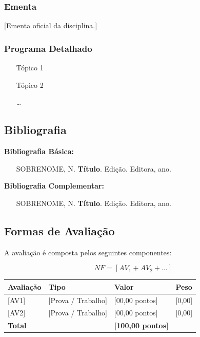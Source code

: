 \documentclass[12pt, a4paper]{article}
\newif\ifmostrarinstrucoes
\newcommand{\instrucao}[1]{%
  \ifmostrarinstrucoes
  \begin{tcolorbox}[colback=instrbg, colframe=dccblue, arc=2mm, boxrule=0.6pt,
    title=\textbf{INSTRUÇÃO (apagar na versão final)}, fonttitle=\small]
  \small #1
  \end{tcolorbox}
  \fi}
\begin{document}
\subsubsection{Ementa}
[Ementa oficial da disciplina.]

\subsubsection{Programa Detalhado}
\begin{enumerate}
    \item [Tópico 1]
    \item [Tópico 2]
    \item [\ldots]
\end{enumerate}

\subsection{Bibliografia}
\instrucao{Liste a bibliografia básica e complementar adotada pelo professor, no formato ABNT (ou o padrão usado pelo plano de ensino).}
\textbf{Bibliografia Básica:}
\begin{itemize}
    \item [SOBRENOME, N. \textbf{Título}. Edição. Editora, ano.]
\end{itemize}

\textbf{Bibliografia Complementar:}
\begin{itemize}
    \item [SOBRENOME, N. \textbf{Título}. Edição. Editora, ano.]
\end{itemize}

\subsection{Formas de Avaliação}
\instrucao{Descreva a composição da nota e as datas das avaliações. Adapte a fórmula, a tabela e a lista de datas ao plano de ensino.}
A avaliação é composta pelos seguintes componentes:

\begin{equation*}
NF = [AV_1 + AV_2 + \ldots]
\end{equation*}

\vspace{0.3cm}
\noindent
\begin{tabular}{@{}p{2.7cm}p{4.1cm}p{3.6cm}p{1.8cm}@{}}
\hline
\textbf{Avaliação} & \textbf{Tipo} & \textbf{Valor} & \textbf{Peso} \\ \hline
{[AV1]} & [Prova / Trabalho] & [00,00 pontos] & [0,00] \\
{[AV2]} & [Prova / Trabalho] & [00,00 pontos] & [0,00] \\ \hline
\multicolumn{2}{l}{\textbf{Total}} & \textbf{[100,00 pontos]} & \\
\end{tabular}
\vspace{0.3cm}
\end{document}
